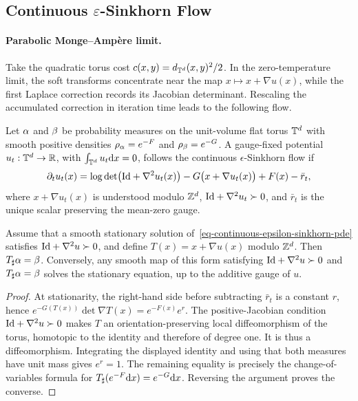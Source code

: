 \subsection{Continuous \texorpdfstring{$\varepsilon$}{epsilon}-Sinkhorn Flow}\label{sec-continuous-epsilon-sinkhorn}
\paragraph{Parabolic Monge--Amp\`ere limit.}
Take the quadratic torus cost $c(x,y)=d_{\mathbb{T}^d}(x,y)^2/2$. In the zero-temperature limit, the soft transforms concentrate near the map $x\mapsto x+\nabla u(x)$, while the first Laplace correction records its Jacobian determinant. Rescaling the accumulated correction in iteration time leads to the following flow.

\begin{defn}\label{def-continuous-epsilon-sinkhorn}
Let $\alpha$ and $\beta$ be probability measures on the unit-volume flat torus $\mathbb{T}^d$ with smooth positive densities $\rho_{\alpha}=e^{-F}$ and $\rho_{\beta}=e^{-G}$. A gauge-fixed potential $u_t:\mathbb{T}^d\to\mathbb{R}$, with $\int_{\mathbb{T}^d}u_t\mathrm{d} x=0$, follows the continuous $\epsilon$-Sinkhorn flow if
\begin{equation}\label{eq-continuous-epsilon-sinkhorn-pde}
\partial_t u_t(x)
=
\log\det\bigl(\mathrm{Id}+\nabla^2u_t(x)\bigr)
-G\bigl(x+\nabla u_t(x)\bigr)
+F(x)-\bar r_t,
\end{equation}
where $x+\nabla u_t(x)$ is understood modulo $\mathbb{Z}^d$, $\mathrm{Id}+\nabla^2u_t\succ0$, and $\bar r_t$ is the unique scalar preserving the mean-zero gauge.
\end{defn}
\begin{prop}\label{prop-continuous-sinkhorn-stationary}
Assume that a smooth stationary solution of~\eqref{eq-continuous-epsilon-sinkhorn-pde} satisfies $\mathrm{Id}+\nabla^2u\succ0$, and define $T(x)=x+\nabla u(x)$ modulo $\mathbb{Z}^d$. Then $T_\sharp\alpha=\beta$. Conversely, any smooth map of this form satisfying $\mathrm{Id}+\nabla^2u\succ0$ and $T_\sharp\alpha=\beta$ solves the stationary equation, up to the additive gauge of $u$.
\end{prop}
\begin{proof}
At stationarity, the right-hand side before subtracting $\bar r_t$ is a constant $r$, hence
\(e^{-G(T(x))}\det\nabla T(x)=e^{-F(x)}e^r.\)
The positive-Jacobian condition $\mathrm{Id}+\nabla^2u\succ0$ makes $T$ an orientation-preserving local diffeomorphism of the torus, homotopic to the identity and therefore of degree one. It is thus a diffeomorphism. Integrating the displayed identity and using that both measures have unit mass gives $e^r=1$. The remaining equality is precisely the change-of-variables formula for $T_\sharp(e^{-F}\mathrm{d} x)=e^{-G}\mathrm{d} x$. Reversing the argument proves the converse.
\end{proof}

